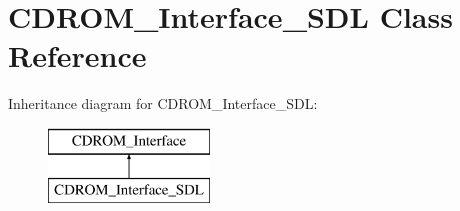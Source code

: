 \hypertarget{classCDROM__Interface__SDL}{\section{C\-D\-R\-O\-M\-\_\-\-Interface\-\_\-\-S\-D\-L Class Reference}
\label{classCDROM__Interface__SDL}
}
Inheritance diagram for C\-D\-R\-O\-M\-\_\-\-Interface\-\_\-\-S\-D\-L\-:\begin{figure}[H]
\begin{center}
\leavevmode
\includegraphics[height=2.000000cm]{classCDROM__Interface__SDL}
\end{center}
\end{figure}
